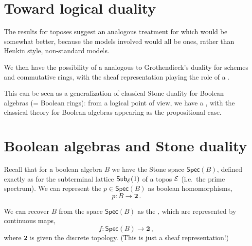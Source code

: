 \documentclass[lambek.tex]{subfiles}
\begin{document}
\section{Toward logical duality}

The results for toposes suggest an analogous treatment for  which would be somewhat better, 
because the models involved would all be  ones, rather than Henkin style, non-standard models.
\medskip

We then have the possibility of a  analogous to Grothendieck's duality for schemes and commutative rings, with  
the sheaf representation playing the role of a .
\medskip

This can be seen as a generalization of classical Stone duality for Boolean algebras (= Boolean rings):
from a logical point of view, we have a , 
with the classical theory for Boolean algebras appearing as the propositional case.

\section{Boolean algebras and Stone duality}


Recall that for a boolean algebra $B$ we have the Stone space $\mathsf{Spec}(B)$,  defined exactly as for the subterminal lattice $\mathsf{Sub}_{\mathcal{E}}(1)$ of a topos $\mathcal{E}$ (i.e.\ the prime spectrum).  We can represent the  $p\in \mathsf{Spec}(B)$ as boolean homomorphisms,
\[
p : B\to \mathbf{2}\,.
\]

We can recover $B$ from the space $\mathsf{Spec}(B)$ as the , which are represented by continuous maps,
\[
f : \mathsf{Spec}(B)\to \mathbf{2}\,,
\]
where $\mathbf{2}$ is given the discrete topology. (This is just a  sheaf representation!)


\end{document}
